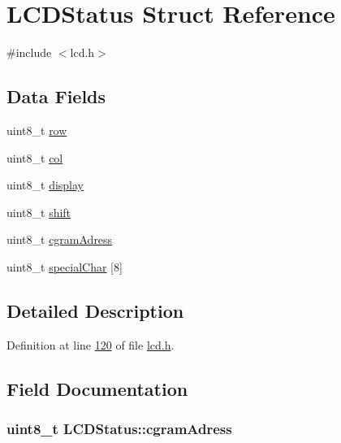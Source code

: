 \hypertarget{struct_l_c_d_status}{\section{L\-C\-D\-Status Struct Reference}
\label{struct_l_c_d_status}
}


{\ttfamily \#include $<$lcd.\-h$>$}

\subsection*{Data Fields}
\begin{DoxyCompactItemize}
\item 
uint8\-\_\-t \hyperlink{struct_l_c_d_status_a1032713b3106af056748cc1766bbf67f}{row}
\item 
uint8\-\_\-t \hyperlink{struct_l_c_d_status_a79a5d5cb370566c8638d9a3866ff8e6b}{col}
\item 
uint8\-\_\-t \hyperlink{struct_l_c_d_status_a844c7ce7851d43e9459d28c2e93d715a}{display}
\item 
uint8\-\_\-t \hyperlink{struct_l_c_d_status_ad69f767818d8a15e1fd6935e07df3770}{shift}
\item 
uint8\-\_\-t \hyperlink{struct_l_c_d_status_a896d1656ee60acf6ad7bcce2cdf3edae}{cgram\-Adress}
\item 
uint8\-\_\-t \hyperlink{struct_l_c_d_status_a8a1571d6288e2ec1ed1114fca2f873be}{special\-Char} \mbox{[}8\mbox{]}
\end{DoxyCompactItemize}


\subsection{Detailed Description}


Definition at line \hyperlink{lcd_8h_source_l00120}{120} of file \hyperlink{lcd_8h_source}{lcd.\-h}.



\subsection{Field Documentation}
\hypertarget{struct_l_c_d_status_a896d1656ee60acf6ad7bcce2cdf3edae}{
\subsubsection[{cgram\-Adress}]{\setlength{\rightskip}{0pt plus 5cm}uint8\-\_\-t L\-C\-D\-Status\-::cgram\-Adress}}\label{struct_l_c_d_status_a896d1656ee60acf6ad7bcce2cdf3edae}


